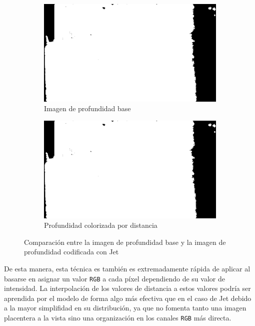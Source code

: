 \documentclass[12pt,a4paper]{report}
\begin{document}
\begin{figure}[!h]
    \centering
    \begin{subfigure}{0.45\textwidth}
        \centering
        \includegraphics[width=\textwidth]{media/data/depth_gueese.png}
        \caption{Imagen de profundidad base}
        \label{fig:depth-base-distance}
    \end{subfigure}
    \hfill
    \begin{subfigure}{0.45\textwidth}
        \centering
        \includegraphics[width=\textwidth]{media/data/depth_gueese.png}
        \caption{Profundidad colorizada por distancia}
        \label{fig:distance-colorization}
    \end{subfigure}
    \caption{Comparación entre la imagen de profundidad base y la imagen de profundidad codificada con Jet}
    \label{fig:distance-comparison}
\end{figure}

De esta manera, esta técnica es también es extremadamente rápida de aplicar al basarse en asignar un valor \texttt{RGB} a cada píxel dependiendo de su valor de intensidad. La interpolación de los valores de distancia a estos valores podría ser aprendida por el modelo de forma algo más efectiva que en el caso de Jet debido a la mayor simplifidad en su distribución, ya que no fomenta tanto una imagen placentera a la vista sino una organización en los canales \texttt{RGB} más directa.
\end{document}
